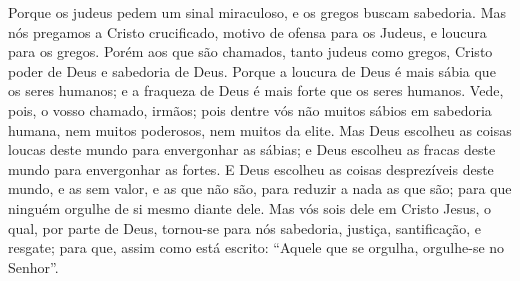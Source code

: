 {  Porque os judeus pedem um sinal miraculoso, e os gregos buscam sabedoria.
  Mas nós pregamos a Cristo crucificado,
{} motivo de ofensa para os Judeus, e loucura para os gregos.
  Porém aos que são chamados, tanto judeus como gregos, Cristo
{} poder de Deus e sabedoria de Deus.
  Porque a loucura de Deus é mais sábia que os seres humanos; e a fraqueza de Deus é mais forte que os seres humanos.
  Vede, pois, o vosso chamado, irmãos; pois dentre vós não
{} muitos sábios em sabedoria humana,
 nem muitos poderosos, nem muitos da elite.
  Mas Deus escolheu as coisas loucas deste mundo para envergonhar as sábias; e Deus escolheu as fracas deste mundo para envergonhar as fortes.
  E Deus escolheu as coisas desprezíveis deste mundo, e as sem valor, e as que não são, para reduzir a nada as que são;
  para que ninguém
 orgulhe de si mesmo diante dele.
  Mas vós sois dele em Cristo Jesus, o qual, por parte de Deus, tornou-se para nós sabedoria, justiça, santificação, e resgate;
  para que, assim como está escrito: “Aquele que se orgulha, orgulhe-se no Senhor”.
\par }

